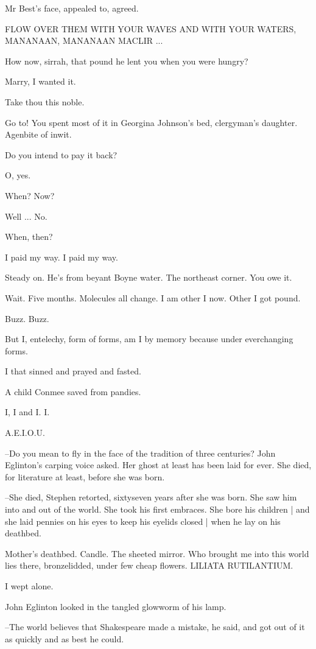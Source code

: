 Mr Best's face,
appealed to,
agreed.


    FLOW OVER THEM WITH YOUR WAVES AND WITH YOUR WATERS, MANANAAN,
    MANANAAN MACLIR ...


How now,
sirrah,
that pound he lent you when you were hungry?

Marry,
I wanted it.

Take thou this noble.

Go to!
You spent most of it in Georgina Johnson's bed,
clergyman's daughter.
Agenbite of inwit.

Do you intend to pay it back?

O,
yes.

When?
Now?

Well ...
No.

When,
then?

I paid my way.
I paid my way.

Steady on.
He's from beyant Boyne water.
The northeast corner.
You owe it.

Wait.
Five months.
Molecules all change.
I am other I now.
Other I got pound.

Buzz.
Buzz.

But I,
entelechy,
form of forms,
am I by memory because under everchanging forms.

I that sinned and prayed and fasted.

A child Conmee saved from pandies.

I, I and I.
I.

A.E.I.O.U.

--Do you mean to fly in the face of the tradition of three centuries?
John Eglinton's carping voice asked.
Her ghost at least has been laid for ever.
She died,
for literature at least,
before she was born.

--She died,
Stephen retorted,
sixtyseven years after she was born.
She saw him into and out of the world.
She took his first embraces.
She bore his children |
and she laid pennies on his eyes to keep his eyelids closed |
when he lay on his deathbed.

Mother's deathbed.
Candle.
The sheeted mirror.
Who brought me into this world lies there,
bronzelidded,
under few cheap flowers.
LILIATA RUTILANTIUM.

I wept alone.

John Eglinton looked in the tangled glowworm of his lamp.

--The world believes that Shakespeare made a mistake,
he said,
and got out of it as quickly and as best he could.

